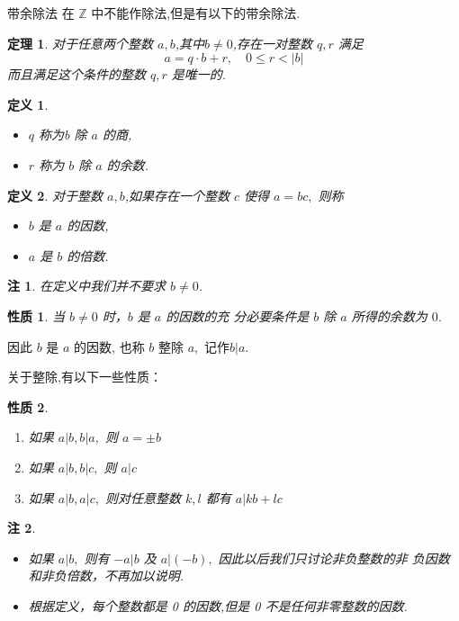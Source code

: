 \documentclass[13pt,fontset=mac]{ctexbeamer}
\newtheorem{thm}{定理}
\newtheorem*{defi}{定义}
\newtheorem*{rem}{注}
\newtheorem*{prop}{性质}
\begin{document}
\begin{frame}{带余除法}
在 $\mathbb{Z}$ 中不能作除法,但是有以下的\alert{带余除法}.
\begin{thm}
对于任意两个整数 $a ,b$,其中$b\neq 0$,存在一对整数 $q, r$ 满足
\[
a=q \cdot b+r, \quad 0 \leqslant r<|b|
\]
而且满足这个条件的整数 $q, r$ 是唯一的.
\end{thm}
\begin{defi}
\begin{itemize}
\item $q$ 称为b 除 $a$ 的\alert{商},
\item $r$ 称为 $b$ 除 $a$ 的\alert{余数}.
\end{itemize}
\end{defi}

\end{frame}

\begin{frame}
\begin{defi}
	对于整数 $a ,b$,如果存在一个整数 $c$ 使得 $a=b c,$ 则称
\begin{itemize}
\item $b$ 是 $a$ 的\alert{因数},
\item $a$ 是 $b$ 的\alert{倍数}.
\end{itemize}
\end{defi}
\begin{rem}
在定义中我们并不要求 $b\neq0$.
\end{rem}



    \begin{prop}
        当 $b\neq 0$ 时，$b$ 是 $a$ 的因数的充 分必要条件是 $b$ 除 $a$ 所得的余数为 $0$.
    \end{prop}
    因此 $b$ 是 $a$ 的因数, 也称 $b$ \alert{整除} $a,$ 记作$b | a$.

\end{frame}

\begin{frame}
关于整除,有以下一些性质：
\begin{prop}
\begin{enumerate}
\item 如果 $a|b, b| a,$ 则 $a=\pm b$
\item 如果 $a|b, b| c,$ 则 $a | c$
\item  如果 $a|b, a| c,$ 则对任意整数 $k, l$ 都有 $a | k b+l c$
\end{enumerate}
\end{prop}
\begin{rem}
\begin{itemize}
\item 如果 $a | b,$ 则有 $-a | b$ 及 $a |(-b),$ 因此以后我们只讨论\alert{非负整数}的\alert{非 负因数}和\alert{非负倍数}，不再加以说明.

\item 根据定义，每个整数都是 0 的因数,但是 0 不是任何非零整数的因数.
\end{itemize}
\end{rem}

\end{frame}
\end{document}
